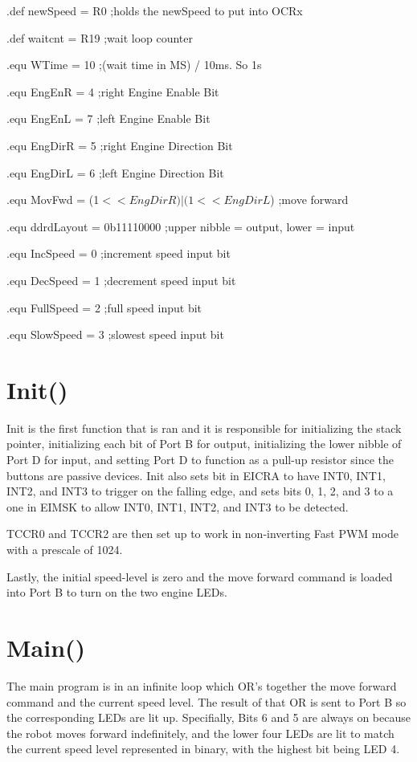 \documentclass[12pt,letterpaper]{article}
\begin{document}
	.def	newSpeed = R0		\hfill	;holds the newSpeed to put into OCRx
	
	.def  	waitcnt = R19		\hfill	;wait loop counter
	
	.equ  	WTime = 10			\hfill	;(wait time in MS) / 10ms. So 1s
	
	.equ	EngEnR = 4			\hfill	;right Engine Enable Bit
	
	.equ	EngEnL = 7			\hfill	;left Engine Enable Bit
	
	.equ	EngDirR = 5				\hfill;right Engine Direction Bit
	
	.equ	EngDirL = 6			\hfill	;left Engine Direction Bit
	
	.equ  	MovFwd = (1$<<EngDirR)|(1<<EngDirL$) \hfill ;move forward
	
	.equ    ddrdLayout = 0b11110000	\hfill;upper nibble = output, lower = input
	
	.equ  	IncSpeed = 0		\hfill	;increment speed input bit
	
	.equ  	DecSpeed = 1		\hfill	;decrement speed input bit
	
	.equ  	FullSpeed = 2		\hfill	;full speed input bit
	
	.equ  	SlowSpeed = 3		\hfill	;slowest speed input bit


\section{Init()}
	Init is the first function that is ran and it is responsible for initializing the stack pointer, initializing each bit of Port B for output, initializing the lower nibble of Port D for input, and setting Port D to function as a pull-up resistor since the buttons are passive devices.
	Init also sets bit in EICRA to have INT0, INT1, INT2, and INT3 to trigger on the falling edge, and sets bits 0, 1, 2, and 3 to a one in EIMSK to allow INT0, INT1, INT2, and INT3 to be detected.
	
	TCCR0 and TCCR2 are then set up to work in non-inverting Fast PWM mode with a prescale of 1024.
	
	Lastly, the initial speed-level is zero and the move forward command is loaded into Port B to turn on the two engine LEDs.
	
	
\section{Main()}
	The main program is in an infinite loop which OR's together the move forward command and the current speed level.
	The result of that OR is sent to Port B so the corresponding LEDs are lit up.
	Specifially, Bits 6 and 5 are always on because the robot moves forward indefinitely, and the lower four LEDs are lit to match the current speed level represented in binary, with the highest bit being LED 4.
\end{document}
